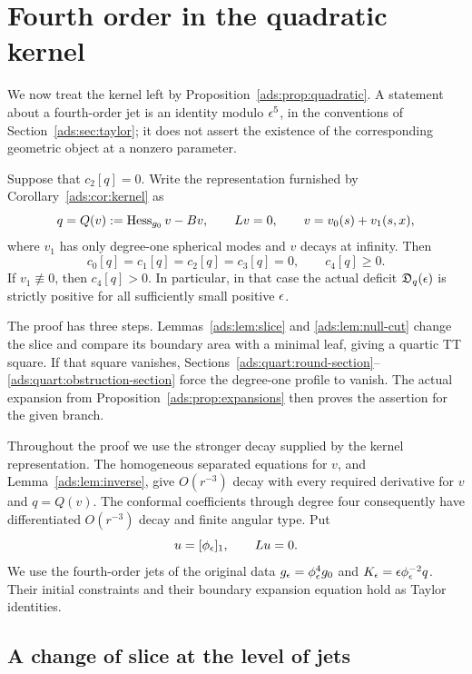 \section{Fourth order in the quadratic kernel}
\label{ads:sec:quartic}

We now treat the kernel left by Proposition~\ref{ads:prop:quadratic}.
A statement about a fourth-order jet is an identity modulo \(\epsilon^5\),
in the conventions of Section~\ref{ads:sec:taylor}; it does not assert the
existence of the corresponding geometric object at a nonzero parameter.

\begin{proposition}
\label{ads:prop:quartic}
Suppose that \(c_2[q]=0\).  Write the representation furnished by
Corollary~\ref{ads:cor:kernel} as
\[
 q=Q(v):=\operatorname{Hess}_{g_0}v-Bv,\qquad Lv=0,
 \qquad v=v_0(s)+v_1(s,x),
\]
where \(v_1\) has only degree-one spherical modes and \(v\) decays at
infinity.  Then
\[
 c_0[q]=c_1[q]=c_2[q]=c_3[q]=0,
 \qquad c_4[q]\geq 0.
\]
If \(v_1\not\equiv0\), then \(c_4[q]>0\).  In particular, in that
case the actual deficit \(\mathfrak D_q(\epsilon)\) is strictly positive
for all sufficiently small positive \(\epsilon\).
\end{proposition}

The proof has three steps. Lemmas~\ref{ads:lem:slice} and
\ref{ads:lem:null-cut} change the slice and compare its boundary area with
a minimal leaf, giving a quartic TT square. If that square vanishes,
Sections~\ref{ads:quart:round-section}--\ref{ads:quart:obstruction-section}
force the degree-one profile to vanish. The actual expansion from
Proposition~\ref{ads:prop:expansions} then proves the assertion for the
given branch.

Throughout the proof we use the stronger decay supplied by the kernel
representation.  The homogeneous separated equations for \(v\), and
Lemma~\ref{ads:lem:inverse}, give \(O(r^{-3})\) decay with every required
derivative for \(v\) and \(q=Q(v)\).  The conformal coefficients through
degree four consequently have differentiated \(O(r^{-3})\) decay and
finite angular type.  Put
\[
 u=[\phi_\epsilon]_1,\qquad Lu=0.
\]
We use the fourth-order jets of the original data
\(g_\epsilon=\phi_\epsilon^4g_0\) and
\(K_\epsilon=\epsilon\phi_\epsilon^{-2}q\).  Their initial constraints and their
boundary expansion equation hold as Taylor identities.

\subsection{A change of slice at the level of jets}

